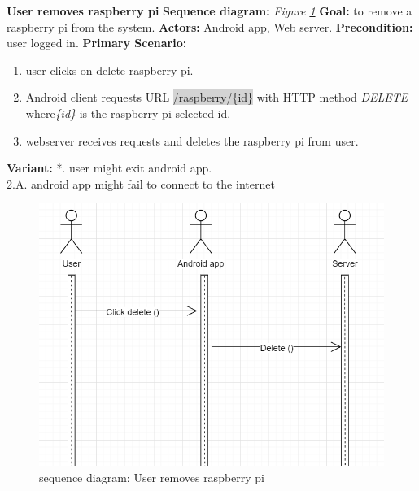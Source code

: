 \documentclass[12pt, oneside, a4paper]{book}
\newcommand{\code}[1]{{\color{red}\colorbox{lightgray}{#1}}}
\newcommand\boldcolor[1]{\textcolor{bold}{\textbf{#1}}}
\begin{document}
				\newpage\hspace*{-6mm}\boldcolor{User removes raspberry pi}
				\newline\textbf{Sequence diagram:} \textit{Figure \ref{user_rp_rm}}
				\newline\textbf{Goal:} to remove a raspberry pi from the system.
				\newline\textbf{Actors:} Android app, Web server.
				\newline\textbf{Precondition:} user logged in.
				\newline\textbf{Primary Scenario:}	
				\begin{enumerate}[label*=\arabic*.]
					\item user clicks on delete raspberry pi.
					\item Android client requests URL \code{/raspberry/\{id\}} with HTTP method \textit{DELETE} where\textit{\{id\}} is the raspberry pi selected id. 
					\item webserver receives requests and deletes the raspberry pi from user.
				\end{enumerate}
				\textbf{Variant:}\newline
				\hspace*{5mm}*. user might exit android app. \\
				\hspace*{5mm}2.A. android app might fail to connect to the internet \\
				\begin{figure}[H]
					\includegraphics[width=\linewidth]{img/sequence_user_rp_rm.png}
					\caption{sequence diagram: User removes raspberry pi}
					\label{user_rp_rm}
				\end{figure}
\end{document}
